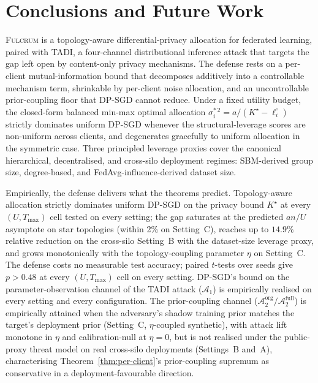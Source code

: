 \documentclass[letterpaper,journal]{IEEEtran}
\newcommand{\TADI}{\textsc{TADI}\xspace}
\newcommand{\Fulcrum}{\textsc{Fulcrum}\xspace}
\newcommand{\Adv}{\mathcal{A}}
\newcommand{\Tmax}{T_{\max}}
\begin{document}
\section{Conclusions and Future Work}
\label{sec:conclusion}

\Fulcrum is a topology-aware differential-privacy allocation for
federated learning, paired with \TADI, a four-channel distributional
inference attack that targets the gap left open by content-only privacy
mechanisms. The defense rests on a per-client mutual-information bound
that decomposes additively into a controllable mechanism term,
shrinkable by per-client noise allocation, and an uncontrollable
prior-coupling floor that DP-SGD cannot reduce. Under a fixed utility
budget, the closed-form balanced min-max optimal allocation
$\sigma_i^{*\,2} = a/(K^\star - \ell_i^\circ)$ strictly dominates
uniform DP-SGD whenever the structural-leverage scores are non-uniform
across clients, and degenerates gracefully to uniform allocation in the
symmetric case. Three principled leverage proxies cover the canonical hierarchical,
decentralised, and cross-silo deployment regimes: SBM-derived group
size, degree-based, and FedAvg-influence-derived dataset size.

Empirically, the defense delivers what the theorems predict.
Topology-aware allocation strictly dominates uniform DP-SGD on the
privacy bound $K^\star$ at every $(U, \Tmax)$ cell tested on every
setting; the gap saturates at the predicted $an/U$ asymptote on
star topologies (within 2\% on Setting~C), reaches up to $14.9\%$
relative reduction on the cross-silo Setting~B with the dataset-size
leverage proxy, and grows monotonically with the topology-coupling
parameter $\eta$ on Setting~C. The defense costs no measurable test
accuracy; paired $t$-tests over seeds give $p > 0.48$ at every
$(U, \Tmax)$ cell on every setting. DP-SGD's bound on the
parameter-observation channel of the \TADI attack ($\Adv_1$) is
empirically realised on every setting and every configuration. The
prior-coupling channel ($\Adv_2^{\text{org}} / \Adv_2^{\text{full}}$)
is empirically attained when the adversary's shadow training prior
matches the target's deployment prior (Setting~C, $\eta$-coupled
synthetic), with attack lift monotone in $\eta$ and calibration-null at
$\eta=0$, but is not realised under the public-proxy threat model
on real cross-silo deployments (Settings~B and~A), characterising
Theorem~\ref{thm:per-client}'s prior-coupling supremum as conservative
in a deployment-favourable direction.
\end{document}

